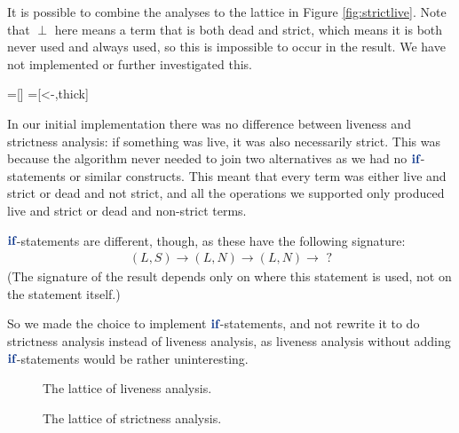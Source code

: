 \documentclass[a4paper,11pt]{article}
\newcommand{\hKeyword}[1]{\textbf{\color{steelblue}{#1}}}
\begin{document}
  It is possible to combine the analyses to the lattice in Figure
  \ref{fig:strictlive}. Note that $\perp$ here means a term that is both dead
  and strict, which means it is both never used and always used, so this is
  impossible to occur in the result. We have not implemented or further
  investigated this.
  
  =[]
  =[<-,thick]

  In our initial implementation there was no difference between liveness and
  strictness analysis: if something was live, it was also necessarily strict.
  This was because the algorithm never needed to join two alternatives as we
  had no \ensuremath{\hKeyword{if}}-statements or similar constructs. This meant that every term was
  either live and strict or dead and not strict, and all the operations we
  supported only produced live and strict or dead and non-strict terms.

  \ensuremath{\hKeyword{if}}-statements are different, though, as these have the following
  signature:
  \begin{align*}
    (L, S) \to (L, N) \to (L, N) \to\text{ ?}
  \end{align*}
  (The signature of the result depends only on where this statement is used,
  not on the statement itself.)

  So we made the choice to implement \ensuremath{\hKeyword{if}}-statements, and not rewrite it to do
  strictness analysis instead of liveness analysis, as liveness analysis
  without adding \ensuremath{\hKeyword{if}}-statements would be rather uninteresting.

  \begin{figure}
    \begin{center}
    \end{center}
    \caption{The lattice of liveness analysis.} \label{fig:live}
  \end{figure}
  
  \begin{figure}
    \begin{center}
    \end{center}
    \caption{The lattice of strictness analysis.} \label{fig:strict}
  \end{figure}
\end{document}
